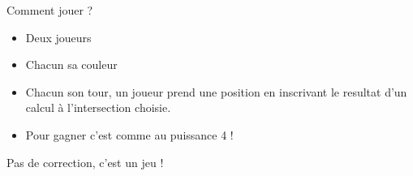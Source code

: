 \numeroteEnigme
\begin{enigme}
    Comment jouer ?
    \begin{itemize}
        \item Deux joueurs
        \item Chacun sa couleur
        \item Chacun son tour, un joueur prend une position en inscrivant le resultat d'un calcul à l'intersection choisie.
        \item Pour gagner c'est comme au puissance 4 !
    \end{itemize}
    
\end{enigme}

\addtocounter{exercice}{-1}
\begin{corrige}
Pas de correction, c'est un jeu !
\end{corrige}
